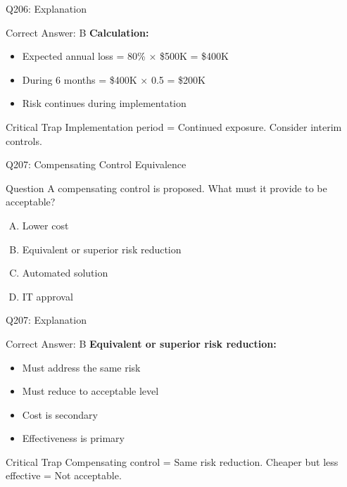 \documentclass{beamer}
\begin{document}
	\begin{frame}{Q206: Explanation}
		\begin{block}{Correct Answer: B}
			\textbf{Calculation:}
			\begin{itemize}
				\item Expected annual loss = 80\% × \$500K = \$400K
				\item During 6 months = \$400K × 0.5 = \$200K
				\item Risk continues during implementation
			\end{itemize}
		\end{block}
		\begin{alertblock}{Critical Trap}
			Implementation period = Continued exposure.
			Consider interim controls.
		\end{alertblock}
	\end{frame}
	
	\begin{frame}{Q207: Compensating Control Equivalence}
		\begin{block}{Question}
			A compensating control is proposed. What must it provide to be acceptable?
		\end{block}
		\begin{enumerate}[(A)]
			\item Lower cost
			\item Equivalent or superior risk reduction
			\item Automated solution
			\item IT approval
		\end{enumerate}
	\end{frame}
	
	\begin{frame}{Q207: Explanation}
		\begin{block}{Correct Answer: B}
			\textbf{Equivalent or superior risk reduction:}
			\begin{itemize}
				\item Must address the same risk
				\item Must reduce to acceptable level
				\item Cost is secondary
				\item Effectiveness is primary
			\end{itemize}
		\end{block}
		\begin{alertblock}{Critical Trap}
			Compensating control = Same risk reduction.
			Cheaper but less effective = Not acceptable.
		\end{alertblock}
	\end{frame}
	
\end{document}
